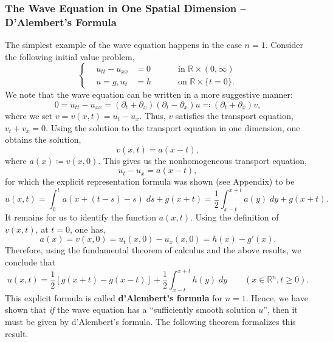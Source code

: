 \documentclass{article}
\begin{document}
\subsubsection{The Wave Equation in One Spatial Dimension -- D'Alembert's Formula}
The simplest example of the wave equation happens in the case $n = 1$. Consider the following initial value problem, 
\begin{equation}
	\left\{
	\begin{alignedat}{3}
		&u_{tt} - u_{xx} &= 0 &\qquad \text{ in $\mathbb{R} \times (0, \infty)$}  \\
		&u = g,  u_{t} &= h &\qquad \text{ on $\mathbb{R} \times \{t = 0\}$}. 
	\end{alignedat}
	\right.
\end{equation}
We note that the wave equation can be written in a more suggestive manner: 
\begin{equation}
	0 = u_{tt} - u_{xx} = (\partial_{t} + \partial_{x})(\partial_{t} - \partial_{x})u \eqqcolon (\partial_{t} + \partial_{x})v, 
\end{equation}
where we set $v = v(x, t) = u_{t} - u_{x}$. Thus, $v$ satisfies the transport equation, $v_{t} + v_{x} = 0$. Using the solution to the transport equation in one dimension, one obtains the solution, 
\begin{equation*}
	v(x, t) = a(x - t), 
\end{equation*}
where $a(x) \coloneqq v(x, 0)$. This gives us the nonhomogeneous transport equation, 
\begin{equation*}
	u_{t} -u_{x} = a(x -t), 
\end{equation*}
for which the explicit representation formula was shown (see Appendix) to be 
\begin{equation}
	u(x, t) = \int_{0}^{t}a(x + (t - s)- s)\;ds + g(x + t) = \frac{1}{2}\int_{x - t}^{x + t}a(y)\;dy + g(x + t). 
\end{equation}
It remains for us to identify the function $a(x, t)$. Using the definition of $v(x, t)$, at $t = 0$, one has, 
\begin{equation*}
	a(x) = v(x,0) = u_{t}(x, 0) - u_{x}(x, 0) = h(x) - g'(x). 
\end{equation*}
Therefore, using the fundamental theorem of calculus and the above results, we conclude that 
\begin{equation}
	\boxed{u(x, t) = \frac{1}{2}\left[g(x + t) - g(x - t)\right] + \frac{1}{2}\int_{x - t}^{x + t}h(y)\;dy} \qquad (x \in \mathbb{R}^{n}, t \geq 0). 
\end{equation}
This explicit formula is called \textbf{d'Alembert's formula} for $n = 1$. Hence, we have shown that \textit{if} the wave equation has a ``sufficiently smooth solution $u$'', then it must be given by d'Alembert's formula. The following theorem formalizes this result. 
\end{document}
